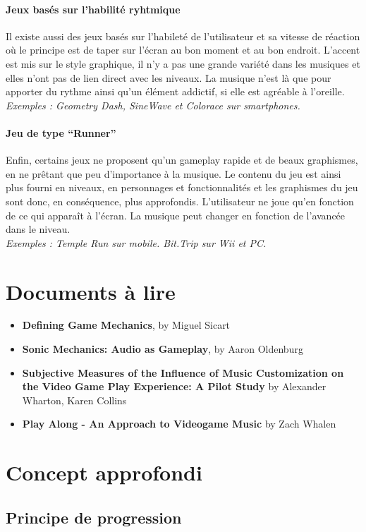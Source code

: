 \documentclass[a4paper,11pt]{article}
\begin{document}
\paragraph{Jeux basés sur l’habilité ryhtmique}
Il existe aussi des jeux basés sur l’habileté de l’utilisateur et sa vitesse de réaction où le principe est de taper sur l’écran au bon moment et au bon endroit. L'accent est mis sur le style graphique, il n'y a pas une grande variété dans les musiques et elles n'ont pas de lien direct avec les niveaux. La musique n'est là que pour apporter du rythme ainsi qu’un élément addictif, si elle est agréable à l’oreille.\\
\textit{Exemples : Geometry Dash, SineWave et Colorace sur smartphones.}
\paragraph{Jeu de type “Runner”}
Enfin, certains jeux ne proposent qu’un gameplay rapide et de beaux graphismes, en ne prêtant que peu d’importance à la musique. Le contenu du jeu est ainsi plus fourni en niveaux, en personnages et fonctionnalités et les graphismes du jeu sont donc, en conséquence, plus approfondis. L’utilisateur ne joue qu’en fonction de ce qui apparaît à l’écran. La musique peut changer en fonction de l’avancée dans le niveau.\\
\textit{Exemples : Temple Run sur mobile. Bit.Trip sur Wii et PC.}

\section{Documents à lire}
\begin{itemize}
\item \textbf{Defining Game Mechanics}, by Miguel Sicart
\item \textbf{Sonic Mechanics: Audio as Gameplay}, by Aaron Oldenburg 
\item \textbf{Subjective Measures of the Influence of Music Customization on the Video Game Play Experience: A Pilot Study} by Alexander Wharton, Karen Collins
\item \textbf{Play Along - An Approach to Videogame Music} by Zach Whalen
\end{itemize}


\section{Concept approfondi}
\subsection{Principe de progression}
\end{document}

